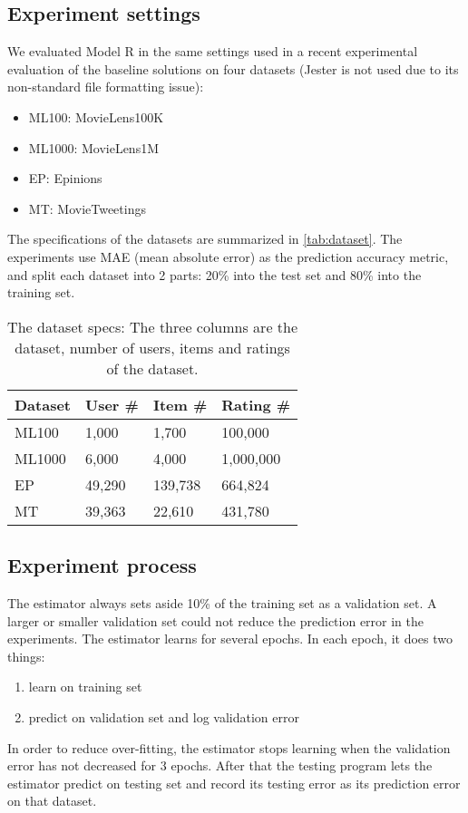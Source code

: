 \documentclass[letterpaper]{article}
\begin{document}
\subsection{Experiment settings}
We evaluated Model R in the same settings used in a recent experimental 
evaluation of the baseline solutions \cite{polatidis2016multi} on four datasets 
(Jester \cite{goldberg2001eigentaste} is not used due to its non-standard file 
formatting issue): 
\begin{itemize}
	\item ML100: MovieLens100K\cite{harper2015movielens}
	\item ML1000: MovieLens1M\cite{harper2015movielens}
	\item EP: Epinions \cite{massa2007trust}
	\item MT: MovieTweetings \cite{dooms2013movietweetings}
\end{itemize}
The specifications of the datasets are summarized in \autoref{tab:dataset}.
The experiments use MAE (mean absolute error) as the prediction accuracy 
metric, and split each dataset into 2 parts: 20\% into the test set and 80\% 
into the training set.
\begin{table}[h]
	\centering
	\caption{The dataset specs: 
		The three columns are the dataset, number of users, items and ratings 
		of the dataset.
		}
	\begin{tabularx}{0.5\textwidth}{ |X|X|X|X|}  \hline \rowcolor{blue!50}
		Dataset & User \# & Item \# & Rating \# \\ \hline
		ML100 & 1,000 & 1,700 & 100,000 \\ \hline
		ML1000 & 6,000 & 4,000 & 1,000,000 \\ \hline
		EP & 49,290 & 139,738 & 664,824 \\ \hline
		MT & 39,363 & 22,610 & 431,780 \\ 
		\hline
	\end{tabularx}
	\label{tab:dataset}
\end{table}

\subsection{Experiment process}
The estimator always sets aside 10\% of the training set as a validation set.
A larger or smaller validation set could not reduce the prediction error in the 
experiments.
The estimator learns for several epochs.
In each epoch, it does two things:
\begin{enumerate}
	\item learn on training set
	\item predict on validation set and log validation error
\end{enumerate}
In order to reduce over-fitting, the estimator stops learning when the 
validation error has not decreased for 3 epochs.
After that the testing program lets the estimator predict on testing set and 
record its testing error as its prediction error on that dataset.
\end{document}
